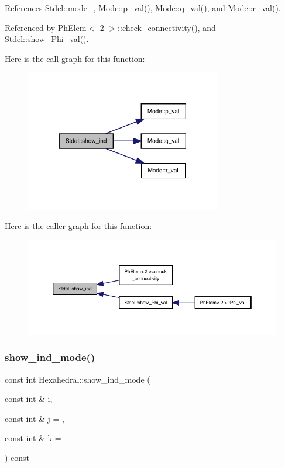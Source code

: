 References Stdel\+::mode\+\_\+, Mode\+::p\+\_\+val(), Mode\+::q\+\_\+val(), and Mode\+::r\+\_\+val().



Referenced by Ph\+Elem$<$ 2 $>$\+::check\+\_\+connectivity(), and Stdel\+::show\+\_\+\+Phi\+\_\+val().

Here is the call graph for this function\+:
\nopagebreak
\begin{figure}[H]
\begin{center}
\leavevmode
\includegraphics[width=242pt]{classStdel_a20afd536025caf1aad1c4e3f41fcb866_cgraph}
\end{center}
\end{figure}
Here is the caller graph for this function\+:
\nopagebreak
\begin{figure}[H]
\begin{center}
\leavevmode
\includegraphics[width=350pt]{classStdel_a20afd536025caf1aad1c4e3f41fcb866_icgraph}
\end{center}
\end{figure}
\mbox{\label{classHexahedral_a3a21196cfe9b317868868985f33aa425}} 
\subsubsection{\texorpdfstring{show\+\_\+ind\+\_\+mode()}{show\_ind\_mode()}}
{\footnotesize\ttfamily const int Hexahedral\+::show\+\_\+ind\+\_\+mode (\begin{DoxyParamCaption}\item[{const int \&}]{i,  }\item[{const int \&}]{j = {},  }\item[{const int \&}]{k = {} }\end{DoxyParamCaption}) const\hspace{0.3cm}{\ttfamily [virtual]}}



